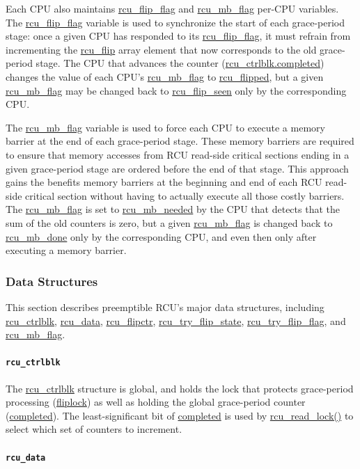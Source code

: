 Each CPU also maintains \url{rcu_flip_flag} and
\url{rcu_mb_flag} per-CPU variables.
The \url{rcu_flip_flag} variable is used to synchronize the
start of each grace-period stage: once a given CPU has responded
to its \url{rcu_flip_flag}, it must refrain from incrementing
the \url{rcu_flip} array element that now corresponds to
the old grace-period stage.
The CPU that advances the counter (\url{rcu_ctrlblk.completed})
changes the value of each CPU's \url{rcu_mb_flag} to
\url{rcu_flipped}, but a given \url{rcu_mb_flag}
may be changed back to \url{rcu_flip_seen} only by
the corresponding CPU.

The \url{rcu_mb_flag} variable is used to force each CPU to
execute a memory barrier at the end of each grace-period stage.
These memory barriers are required to ensure that memory accesses from
RCU read-side critical sections ending in a given grace-period stage
are ordered before the end of that stage.
This approach gains the benefits memory barriers at the
beginning and end of each RCU read-side critical section without
having to actually execute all those costly barriers.
The \url{rcu_mb_flag} is set to \url{rcu_mb_needed} by
the CPU that detects that the sum of the old counters is zero,
but a given \url{rcu_mb_flag} is changed back to
\url{rcu_mb_done} only by the corresponding CPU, and even
then only after executing a memory barrier.

\subsubsection{Data Structures}
\label{app:rcuimpl:Data Structures}

This section describes preemptible RCU's major data structures, including
\url{rcu_ctrlblk}, \url{rcu_data}, \url{rcu_flipctr},
\url{rcu_try_flip_state}, \url{rcu_try_flip_flag}, and
\url{rcu_mb_flag}.

\paragraph{{\tt rcu\_ctrlblk}}
\label{app:rcuimpl:rcu_ctrlblk}

The \url{rcu_ctrlblk} structure is global, and holds the lock
that protects grace-period processing (\url{fliplock}) as well
as holding the global grace-period counter (\url{completed}).
The least-significant bit of \url{completed} is used by
\url{rcu_read_lock()} to select which set of counters to increment.

\paragraph{{\tt rcu\_data}}
\label{app:rcuimpl:rcu_data}

